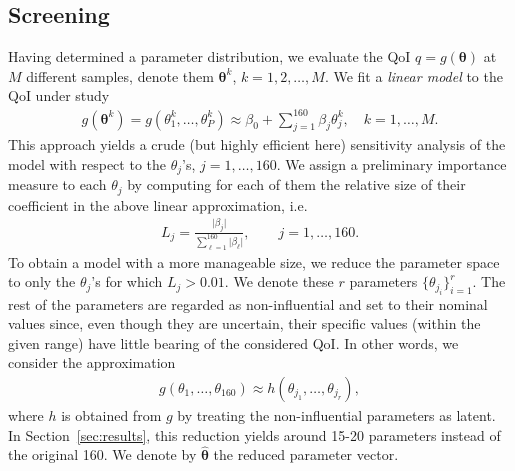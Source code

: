 \subsection{Screening}
\label{sec:screen}
Having determined a parameter distribution, we evaluate the QoI $q=g(\boldsymbol{\theta})$ at $M$ different samples, denote them $\boldsymbol{\theta}^k$, $k=1,2,\dots,M$.
We fit a {\sl linear model} to the QoI under study
\begin{eqnarray}
g(\boldsymbol\theta^k) = g(\theta_1^k, \dots, \theta_P^k) \approx \beta_0 + \sum\limits_{j=1}^{160} \beta_j \theta_j^k, \quad k=1, \dots, M. \label{lr}
\end{eqnarray}
This approach yields a crude (but highly efficient here) sensitivity analysis of the model with respect to the $\theta_j$'s, $j=1,\dots, 160$. We assign a preliminary importance measure to each $\theta_j$ by computing for each of them the relative size of their coefficient in the above linear approximation, i.e.
\begin{eqnarray*}
L_j = \frac{\vert \beta_j \vert}{\sum\limits_{\ell=1}^{160} \vert \beta_\ell \vert}, \qquad j=1,\dots,160.
\end{eqnarray*}
To obtain a model with a more manageable size, we reduce the parameter space to only the $\theta_j$'s for which $L_j>0.01$. We denote these $r$ parameters $\{ \theta_{j_i}\}_{i=1}^r$. The rest of the parameters are regarded as non-influential and set to their nominal values since, even though they are uncertain, their specific values (within the given range) have little bearing of the considered QoI. In other words, we consider the approximation 
\begin{eqnarray}
g(\theta_1, \dots, \theta_{160}) \approx h(\theta_{j_1}, \dots, \theta_{j_r}), \label{reddim}
\end{eqnarray}
where $h$ is obtained from $g$ by treating the non-influential parameters as latent. In Section~\ref{sec:results}, this reduction yields around 15-20 parameters instead of the original 160. We denote by $\hat{\boldsymbol{\theta}}$ the reduced parameter vector. 

